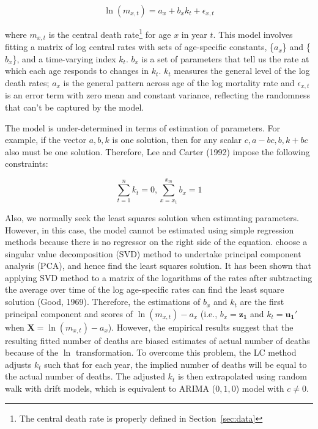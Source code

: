 \documentclass[11pt,a4paper,]{article}
\begin{document}
\begin{equation}
  \ln(m_{x,t})=a_x+b_xk_t+\epsilon_{x,t}
\end{equation}

where \(m_{x,t}\) is the central death
rate\footnote{The central death rate is properly defined in Section~\ref{sec:data}}
for age \(x\) in year \(t\). This model involves fitting a matrix of log
central rates with sets of age-specific constants, \{\(a_x\)\} and
\{\(b_x\)\}, and a time-varying index \(k_t\). \(b_x\) is a set of
parameters that tell us the rate at which each age responds to changes
in \(k_t\). \(k_t\) measures the general level of the log death rates;
\(a_x\) is the general pattern across age of the log mortality rate and
\(\epsilon_{x,t}\) is an error term with zero mean and constant
variance, reflecting the randomness that can't be captured by the model.

The model is under-determined in terms of estimation of parameters. For
example, if the vector \(a,b,k\) is one solution, then for any scalar
\(c, a-bc, b, k+bc\) also must be one solution. Therefore, Lee and
Carter (1992) impose the following constraints:

\begin{equation}
  \sum_{t=1}^{n}k_t=0, \sum_{x=x_1}^{x_m}b_x=1
\end{equation}

Also, we normally seek the least squares solution when estimating
parameters. However, in this case, the model cannot be estimated using
simple regression methods because there is no regressor on the right
side of the equation. \textcite{LC92} choose a singular value
decomposition (SVD) method to undertake principal component analysis
(PCA), and hence find the least squares solution. It has been shown that
applying SVD method to a matrix of the logarithms of the rates after
subtracting the average over time of the log age-specific rates can find
the least square solution (Good, 1969). Therefore, the estimations of
\(b_x\) and \(k_t\) are the first principal component and scores of
\(\ln(m_{x,t})-a_x\) (i.e., \(b_x=\bm{z_1}\) and \(k_t=\bm{u_1}'\) when
\(\bm{X}=\ln(m_{x,t})-a_x\)). However, the empirical results suggest
that the resulting fitted number of deaths are biased estimates of
actual number of deaths because of the \(\ln\) transformation. To
overcome this problem, the LC method adjusts \(k_t\) such that for each
year, the implied number of deaths will be equal to the actual number of
deaths. The adjusted \(k_t\) is then extrapolated using random walk with
drift models, which is equivalent to ARIMA (\(0,1,0\)) model with
\(c\neq0\).
\end{document}
